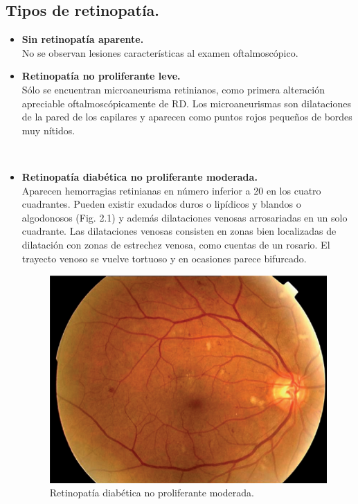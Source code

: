 \documentclass[12pt,letterpaper]{report}
\begin{document}



\subsection{Tipos de retinopatía.}
\begin{itemize}

\item \textbf{Sin retinopatía aparente.}\\
\linebreak 
No se observan lesiones características al examen oftalmoscópico.
\medskip

\item \textbf{Retinopatía no proliferante leve.}\\
\linebreak
Sólo se encuentran microaneurisma retinianos, como primera alteración apreciable oftalmoscópicamente de RD. Los microaneurismas son dilataciones de la pared de los capilares y aparecen como puntos rojos pequeños de bordes muy nítidos.


\medskip\
\item \textbf{Retinopatía diabética no proliferante moderada.}
\\
\linebreak
Aparecen hemorragias retinianas en número inferior a 20 en los cuatro cuadrantes. Pueden existir exudados duros o lipídicos y blandos o algodonosos (Fig. 2.1) y además dilataciones venosas arrosariadas en un solo cuadrante. Las dilataciones venosas consisten en zonas bien localizadas de dilatación con zonas de estrechez venosa, como cuentas de un rosario. El trayecto venoso se vuelve tortuoso y en ocasiones parece bifurcado.


\begin{figure}[!htb]
    \centering
    \includegraphics[width=.75\textwidth]{Img_C2_2.1/FIG_1.png} 
    \caption{Retinopatía diabética no proliferante moderada.}
    \label{fig:fig1}
\end{figure}


\end{itemize}
\end{document}
